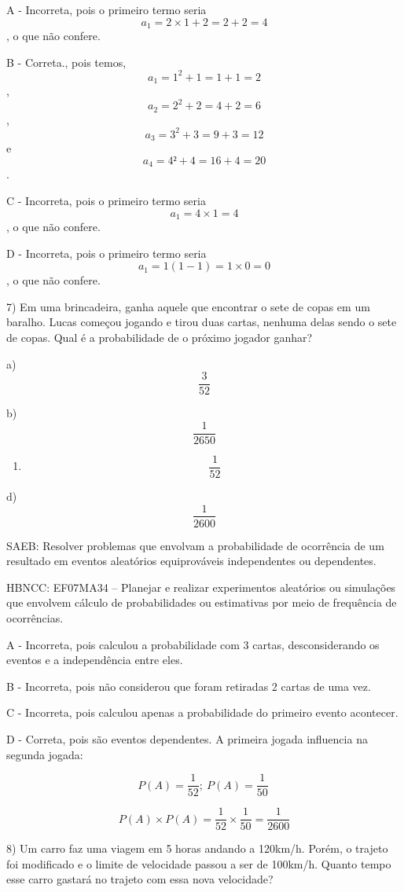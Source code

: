 A - Incorreta, pois o primeiro termo seria
\[a_{1} = 2 \times 1 + 2 = 2 + 2 = 4\], o que não confere.

B - Correta., pois temos, \[a_{1} = 1^{2} + 1 = 1 + 1 = 2\],
\[a_{2} = 2^{2} + 2 = 4 + 2 = 6\], \[a_{3} = 3^{2} + 3 = 9 + 3 = 12\] e
\[a_{4} = 4² + 4 = 16 + 4 = 20\].

C - Incorreta, pois o primeiro termo seria \[a_{1} = 4 \times 1 = 4\], o
que não confere.

D - Incorreta, pois o primeiro termo seria
\[a_{1} = 1\left( 1 - 1 \right) = 1 \times 0 = 0\], o que não confere.

7) Em uma brincadeira, ganha aquele que encontrar o sete de copas em um
baralho. Lucas começou jogando e tirou duas cartas, nenhuma delas sendo
o sete de copas. Qual é a probabilidade de o próximo jogador ganhar?

a) \[\frac{3}{52}\]

b) \[\frac{1}{2650}\]

\begin{enumerate}
\def\labelenumi{\alph{enumi})}
\setcounter{enumi}{2}
\tightlist
\item
  \[\ \frac{1}{52}\]
\end{enumerate}

d) \[\frac{1}{2600}\]

SAEB: Resolver problemas que envolvam a probabilidade de ocorrência de
um resultado em eventos aleatórios equiprováveis independentes ou
dependentes.

HBNCC: EF07MA34 -- Planejar e realizar experimentos aleatórios ou
simulações que envolvem cálculo de probabilidades ou estimativas por
meio de frequência de ocorrências.

A - Incorreta, pois calculou a probabilidade com 3 cartas,
desconsiderando os eventos e a independência entre eles.

B - Incorreta, pois não considerou que foram retiradas 2 cartas de uma
vez.

C - Incorreta, pois calculou apenas a probabilidade do primeiro evento
acontecer.

D - Correta, pois são eventos dependentes. A primeira jogada influencia
na segunda jogada:

\[P\left( A \right) = \frac{1}{52};\ P\left( A \right) = \frac{1}{50}\ \]

\[P\left( A \right) \times P\left( A \right) = \frac{1}{52} \times \frac{1}{50} = \frac{1}{2600}\]

8) Um carro faz uma viagem em 5 horas andando a 120km/h. Porém, o
trajeto foi modificado e o limite de velocidade passou a ser de 100km/h.
Quanto tempo esse carro gastará no trajeto com essa nova velocidade?

